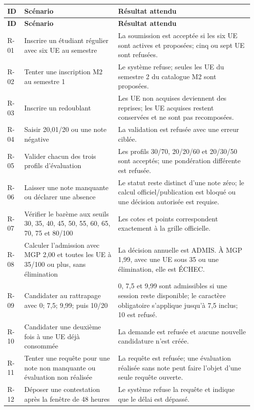 \documentclass[11pt,a4paper]{article}
\begin{document}
\begin{longtable}{L{1.5cm}L{6.0cm}L{7.8cm}}
\toprule
\textbf{ID} & \textbf{Scénario} & \textbf{Résultat attendu} \\
\midrule
\endfirsthead
\toprule
\textbf{ID} & \textbf{Scénario} & \textbf{Résultat attendu} \\
\midrule
\endhead
R-01 & Inscrire un étudiant régulier avec six UE au semestre & La soumission est acceptée si les six UE sont actives et proposées; cinq ou sept UE sont refusées. \\
R-02 & Tenter une inscription M2 au semestre 1 & Le système refuse; seules les UE du semestre 2 du catalogue M2 sont proposées. \\
R-03 & Inscrire un redoublant & Les UE non acquises deviennent des reprises; les UE acquises restent conservées et ne sont pas recomposées. \\
R-04 & Saisir 20,01/20 ou une note négative & La validation est refusée avec une erreur ciblée. \\
R-05 & Valider chacun des trois profils d'évaluation & Les profils 30/70, 20/20/60 et 20/30/50 sont acceptés; une pondération différente est refusée. \\
R-06 & Laisser une note manquante ou déclarer une absence & Le statut reste distinct d'une note zéro; le calcul officiel/publication est bloqué ou une décision autorisée est requise. \\
R-07 & Vérifier le barème aux seuils 30, 35, 40, 45, 50, 55, 60, 65, 70, 75 et 80/100 & Les cotes et points correspondent exactement à la grille officielle. \\
R-08 & Calculer l'admission avec MGP 2,00 et toutes les UE à 35/100 ou plus, sans élimination & La décision annuelle est ADMIS. À MGP 1,99, avec une UE sous 35 ou une élimination, elle est ÉCHEC. \\
R-09 & Candidater au rattrapage avec 0; 7,5; 9,99; puis 10/20 & 0, 7,5 et 9,99 sont admissibles si une session reste disponible; le caractère obligatoire s’applique jusqu’à 7,5 inclus; 10 est refusé. \\
R-10 & Candidater une deuxième fois à une UE déjà consommée & La demande est refusée et aucune nouvelle candidature n'est créée. \\
R-11 & Tenter une requête pour une note non manquante ou évaluation non réalisée & La requête est refusée; une évaluation réalisée sans note peut faire l'objet d'une seule requête ouverte. \\
R-12 & Déposer une contestation après la fenêtre de 48 heures & Le système refuse la requête et indique que le délai est dépassé. \\

\end{longtable}
\end{document}

